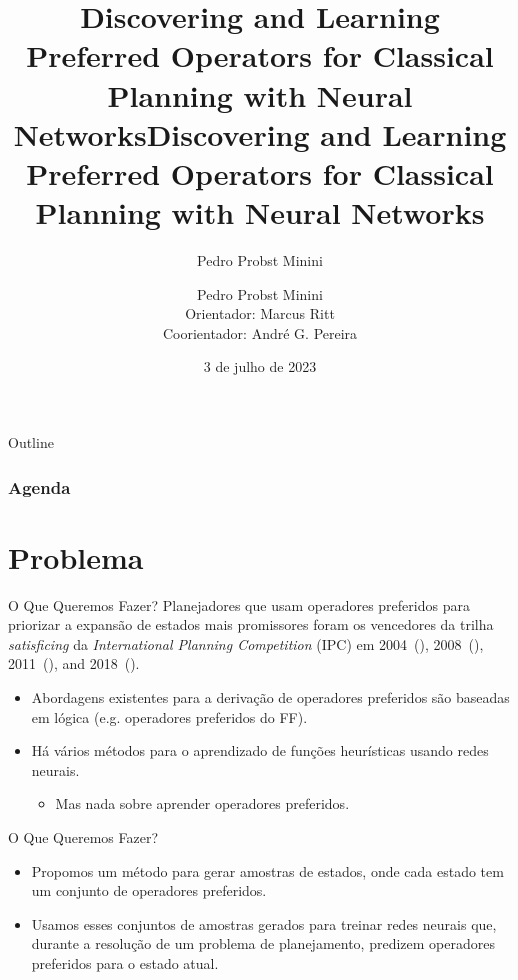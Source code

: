 \documentclass{beamer}
\title[Discovering and Learning Preferred Operators]{Discovering and Learning Preferred Operators for Classical Planning with Neural Networks}
\author{Pedro Probst Minini}
\title[Discovering and Learning Preferred Operators]
      {Discovering and Learning Preferred Operators for Classical Planning with Neural Networks}
\date{3 de julho de 2023}
\author{Pedro Probst Minini \\ \vspace{0.3cm} Orientador: Marcus Ritt \\ Coorientador: André G. Pereira}
\institute{Instituto de Informática --- UFRGS}
\begin{document}

\begin{frame}[plain]
  \titlepage
\end{frame}

\begin{frame}{Outline}
  \frametitle{Agenda}
  \tableofcontents
\end{frame}

\section{Problema}
\begin{frame}{O Que Queremos Fazer?}
Planejadores que usam operadores preferidos para \alert{priorizar a expansão de estados mais promissores} foram os vencedores da trilha \emph{satisficing} da \emph{International Planning Competition} (IPC) em \alert{2004}~(\cite{Helmert/2006}), \alert{2008}~(\cite{Richter.lama.etal/2010}), \alert{2011}~(\cite{Richter.lama.etal/2011}), and \alert{2018}~(\cite{Seipp-fast.etal/2018}).

\pause
\begin{itemize}
  \item Abordagens existentes para a derivação de operadores preferidos são baseadas em lógica (e.g. operadores preferidos do FF).
  \pause
  \item Há vários métodos para o aprendizado de funções heurísticas usando redes neurais.
  \begin{itemize}
    \item Mas nada sobre aprender operadores preferidos.
  \end{itemize}
\end{itemize}
\end{frame}

\begin{frame}{O Que Queremos Fazer?}
\begin{itemize}
  \item Propomos um método para gerar amostras de estados, onde \alert{cada estado tem um conjunto de operadores preferidos}.
  \pause
  \item Usamos esses conjuntos de amostras gerados para \alert{treinar redes neurais} que, durante a resolução de um problema de planejamento, predizem operadores preferidos para o estado atual.
\end{itemize}
\end{frame}
\end{document}
